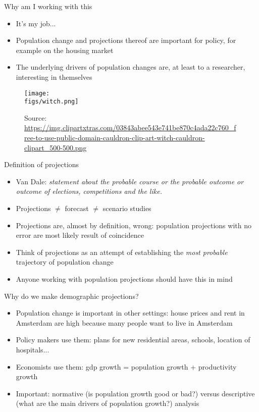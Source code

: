 \documentclass[final, 12pt, aspectratio=169, xcolor={dvipsnames}]{beamer}
\newcommand*{\figs}{../figs}%
\newcommand{\source}[1]{\caption*{\tiny Source: {#1}} }
\begin{document}
\begin{frame}{Why am I working with this}
  \noindent
  \begin{minipage}[t]{0.48\linewidth}%
    \begin{itemize}
    \item It's my job...
    \item Population change and projections thereof are important for policy, for example on the housing market
    \item The underlying drivers of population changes are, at least to a researcher, interesting in themselves
    \end{itemize}
\end{minipage}%
\hfill%
\begin{minipage}[t]{0.48\linewidth}
  \begin{figure}
    \texttt{[image: \\figs/witch.png]}
    \source{\url{https://img.clipartxtras.com/03843abee543e741be870c4ada22c760_free-to-use-public-domain-cauldron-clip-art-witch-cauldron-clipart_500-500.png}}
  \end{figure}  
\end{minipage}    
  
\end{frame}


\begin{frame}{Definition of projections}
  \begin{itemize}
  \item  Van Dale: \textit{statement about the probable course or the probable outcome or outcome of elections, competitions and the like.}
  \item Projections $\neq$ forecast $\neq$ scenario studies
  \item Projections are, almost by definition, wrong: population projections with no error are most likely result of coincidence 
  \item Think of projections as an attempt of establishing the \textit{most probable} trajectory of population change 
    \item Anyone working with population projections should have this in mind
  \end{itemize}
\end{frame}

\begin{frame}{Why do we make demographic projections?}
  \begin{itemize}
  \item Population change is important in other settings: house prices and rent in Amsterdam are high because many people want to live in Amsterdam 
  \item Policy makers use them: plans for new residential areas, schools, location of hospitals...
    \item Economists use them: gdp growth = population growth + productivity growth
  \item Important: normative (is population growth good or bad?) versus descriptive (what are the main drivers of population growth?) analysis 
  \end{itemize}
\end{frame}
\end{document}
